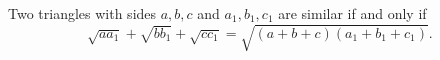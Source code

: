 Two triangles with sides $a, b, c$ and $a_1, b_1, c_1$ are similar if and only if
\[ \sqrt{aa_1} + \sqrt{bb_1} + \sqrt{cc_1} = \sqrt{(a + b + c)(a_1 + b_1 + c_1)}. \]
